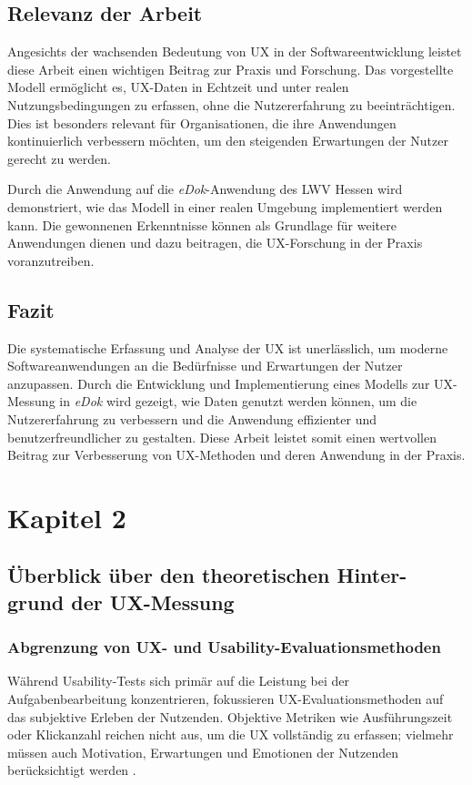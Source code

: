 \documentclass[12pt,oneside]{article}
\begin{document}
\subsection{Relevanz der Arbeit}

Angesichts der wachsenden Bedeutung von UX in der Softwareentwicklung leistet diese Arbeit einen wichtigen Beitrag zur Praxis und Forschung. Das vorgestellte Modell ermöglicht es, UX-Daten in Echtzeit und unter realen Nutzungsbedingungen zu erfassen, ohne die Nutzererfahrung zu beeinträchtigen. Dies ist besonders relevant für Organisationen, die ihre Anwendungen kontinuierlich verbessern möchten, um den steigenden Erwartungen der Nutzer gerecht zu werden.

Durch die Anwendung auf die \textit{eDok}-Anwendung des LWV Hessen wird demonstriert, wie das Modell in einer realen Umgebung implementiert werden kann. Die gewonnenen Erkenntnisse können als Grundlage für weitere Anwendungen dienen und dazu beitragen, die UX-Forschung in der Praxis voranzutreiben.

\subsection{Fazit}

Die systematische Erfassung und Analyse der UX ist unerlässlich, um moderne Softwareanwendungen an die Bedürfnisse und Erwartungen der Nutzer anzupassen. Durch die Entwicklung und Implementierung eines Modells zur UX-Messung in \textit{eDok} wird gezeigt, wie Daten genutzt werden können, um die Nutzererfahrung zu verbessern und die Anwendung effizienter und benutzerfreundlicher zu gestalten. Diese Arbeit leistet somit einen wertvollen Beitrag zur Verbesserung von UX-Methoden und deren Anwendung in der Praxis.
\section{Kapitel 2}
\subsection{Überblick über den theoretischen Hinter-
grund der UX-Messung}

\subsubsection{Abgrenzung von UX- und Usability-Evaluationsmethoden}
Während Usability-Tests sich primär auf die Leistung bei der Aufgabenbearbeitung konzentrieren, fokussieren UX-Evaluationsmethoden auf das subjektive Erleben der Nutzenden. Objektive Metriken wie Ausführungszeit oder Klickanzahl reichen nicht aus, um die UX vollständig zu erfassen; vielmehr müssen auch Motivation, Erwartungen und Emotionen der Nutzenden berücksichtigt werden \cite{DevelopmentNeeds}.
\end{document}
